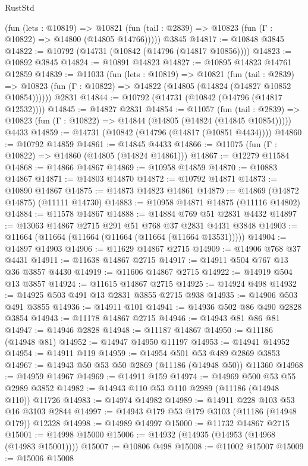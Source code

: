 \begin{lexlean}{RustStd}
\begin{coremodule}
      (fun (lets : @10819) =>
      @10821 (fun (tail : @2839) => @10823 (fun (Γ : @10822) => @14800 (@14805 @14766)))))
    @3845
@14817 := @10848 @3845
@14822 := @10792 (@14731 (@10842 (@14796 (@14817 @10856))))
@14823 := @10892 @3845
@14824 := @10891 @14823
@14827 := @10895 @14823 @14761 @12859
@14839 := @11033
    (fun (lets : @10819) =>
    @10821
      (fun (tail : @2839) =>
      @10823 (fun (Γ : @10822) => @14822 (@14805 (@14824 (@14827 @10852 @10854))))))
    @2831
@14844 := @10792 (@14731 (@10842 (@14796 (@14817 @12532))))
@14845 := @14827 @2831
@14854 := @11057
    (fun (tail : @2839) => @10823 (fun (Γ : @10822) => @14844 (@14805 (@14824 (@14845 @10854)))))
    @4433
@14859 := @14731 (@10842 (@14796 (@14817 (@10851 @4434))))
@14860 := @10792 @14859
@14861 := @14845 @4433
@14866 := @11075 (fun (Γ : @10822) => @14860 (@14805 (@14824 @14861)))
@14867 := @12279 @11584
@14868 := @14866 @14867
@14869 := @10958 @14859
@14870 := @10883 @14867
@14871 := @14803 @14870
@14872 := @10792 @14871
@14873 := @10890 @14867
@14875 := @14873 @14823 @14861
@14879 := @14869 (@14872 @14875) (@11111 @14730)
@14883 := @10958 @14871 @14875 (@11116 @14802)
@14884 := @11578 @14867
@14888 := @14884 @769 @51 @2831 @4432
@14897 := @13063 @14867 @2715 @291 @51 @768 @37 @2831 @4431 @3848
@14903 := @11664 (@11664 (@11664 (@11664 (@11664 (@11664 @13531)))))
@14904 := @14897 @14903
@14906 := @11629 @14867 @2715
@14909 := @14906 @768 @37 @4431
@14911 := @11638 @14867 @2715
@14917 := @14911 @504 @767 @13 @36 @3857 @4430
@14919 := @11606 @14867 @2715
@14922 := @14919 @504 @13 @3857
@14924 := @11615 @14867 @2715
@14925 := @14924 @498
@14932 := @14925 @503 @491 @13 @2831 @3855 @2715 @938
@14935 := @14906 @503 @491 @3855
@14936 := @14911 @101
@14941 := @14936 @502 @86 @490 @2828 @3854
@14943 := @11178 @14867 @2715
@14946 := @14943 @81 @86 @81
@14947 := @14946 @2828
@14948 := @11187 @14867
@14950 := @11186 (@14948 @81)
@14952 := @14947 @14950 @11197
@14953 := @14941 @14952
@14954 := @14911 @119
@14959 := @14954 @501 @53 @489 @2869 @3853
@14967 := @14943 @50 @53 @50 @2869 (@11186 (@14948 @50)) @11360
@14968 := @14959 @14967
@14969 := @14911 @159
@14974 := @14969 @500 @53 @55 @2989 @3852
@14982 := @14943 @110 @53 @110 @2989 (@11186 (@14948 @110)) @11726
@14983 := @14974 @14982
@14989 := @14911 @228 @103 @53 @16 @3103 @2844
@14997 := @14943 @179 @53 @179 @3103 (@11186 (@14948 @179)) @12328
@14998 := @14989 @14997
@15000 := @11732 @14867 @2715
@15001 := @14998 @15000
@15006 := @14932 (@14935 (@14953 (@14968 (@14983 @15001))))
@15007 := @10806 @498
@15008 := @11002 @15007
@15009 := @15006 @15008

\end{coremodule}
\end{lexlean}
